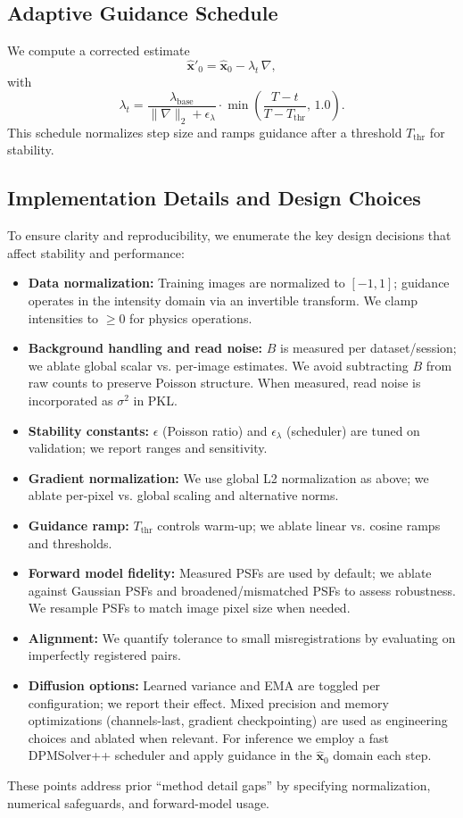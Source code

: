 \documentclass{article}
\begin{document}
\subsection{Adaptive Guidance Schedule}
We compute a corrected estimate
\begin{equation}
\hat{\mathbf{x}}'_0 = \hat{\mathbf{x}}_0 - \lambda_t\,\nabla,
\end{equation}
with
\begin{equation}
\lambda_t = \frac{\lambda_{\text{base}}}{\lVert\nabla\rVert_2 + \epsilon_\lambda}\cdot \min\left(\frac{T-t}{T-T_{\text{thr}}},\,1.0\right).
\end{equation}
This schedule normalizes step size and ramps guidance after a threshold $T_{\text{thr}}$ for stability.

\subsection{Implementation Details and Design Choices}
To ensure clarity and reproducibility, we enumerate the key design decisions that affect stability and performance:
\begin{itemize}
    \item \textbf{Data normalization:} Training images are normalized to $[-1,1]$; guidance operates in the intensity domain via an invertible transform. We clamp intensities to $\ge 0$ for physics operations.
    \item \textbf{Background handling and read noise:} $B$ is measured per dataset/session; we ablate global scalar vs. per-image estimates. We avoid subtracting $B$ from raw counts to preserve Poisson structure. When measured, read noise is incorporated as $\sigma^2$ in PKL.
    \item \textbf{Stability constants:} $\epsilon$ (Poisson ratio) and $\epsilon_\lambda$ (scheduler) are tuned on validation; we report ranges and sensitivity.
    \item \textbf{Gradient normalization:} We use global L2 normalization as above; we ablate per-pixel vs. global scaling and alternative norms.
    \item \textbf{Guidance ramp:} $T_{\text{thr}}$ controls warm-up; we ablate linear vs. cosine ramps and thresholds.
    \item \textbf{Forward model fidelity:} Measured PSFs are used by default; we ablate against Gaussian PSFs and broadened/mismatched PSFs to assess robustness. We resample PSFs to match image pixel size when needed.
    \item \textbf{Alignment:} We quantify tolerance to small misregistrations by evaluating on imperfectly registered pairs.
    \item \textbf{Diffusion options:} Learned variance and EMA are toggled per configuration; we report their effect. Mixed precision and memory optimizations (channels-last, gradient checkpointing) are used as engineering choices and ablated when relevant. For inference we employ a fast DPMSolver++ scheduler and apply guidance in the $\hat{\mathbf{x}}_0$ domain each step.
\end{itemize}
These points address prior “method detail gaps” by specifying normalization, numerical safeguards, and forward-model usage.
\end{document}
